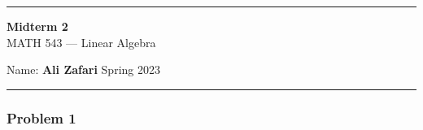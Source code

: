 \documentclass[12pt, letterpaper]{scrartcl}
\begin{document}
\begin{center}
    \hrule
    \vspace{0.4cm}
    { \textbf{{\large Midterm 2}} \\ MATH 543 --- Linear Algebra}
\end{center}
{ Name: \textbf{Ali Zafari} \hspace{\fill} Spring 2023 } \newline\hrule

\subsubsection*{Problem 1}
\end{document}
